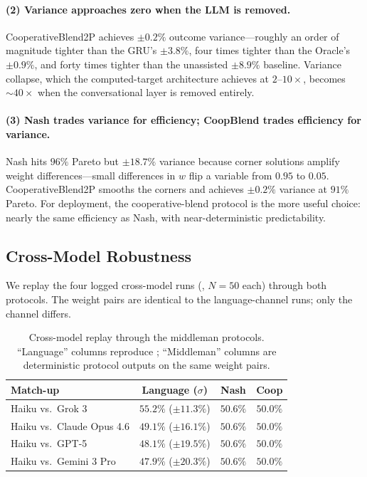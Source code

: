 \documentclass[11pt,a4paper]{article}
\begin{document}
\paragraph{(2) Variance approaches zero when the LLM is removed.} CooperativeBlend2P achieves $\pm 0.2\%$ outcome variance---roughly an order of magnitude tighter than the GRU's $\pm 3.8\%$, four times tighter than the Oracle's $\pm 0.9\%$, and forty times tighter than the unassisted $\pm 8.9\%$ baseline. Variance collapse, which the computed-target architecture achieves at $2$--$10\times$, becomes $\sim 40\times$ when the conversational layer is removed entirely.

\paragraph{(3) Nash trades variance for efficiency; CoopBlend trades efficiency for variance.} Nash hits $96\%$ Pareto but $\pm 18.7\%$ variance because corner solutions amplify weight differences---small differences in $w$ flip a variable from $0.95$ to $0.05$. CooperativeBlend2P smooths the corners and achieves $\pm 0.2\%$ variance at $91\%$ Pareto. For deployment, the cooperative-blend protocol is the more useful choice: nearly the same efficiency as Nash, with near-deterministic predictability.

\subsection{Cross-Model Robustness}
\label{sec:middleman_crossmodel}

We replay the four logged cross-model runs (, $N\!=\!50$ each) through both protocols. The weight pairs are identical to the language-channel runs; only the channel differs.

\begin{table}[h]
\centering
\caption{Cross-model replay through the middleman protocols. ``Language'' columns reproduce ; ``Middleman'' columns are deterministic protocol outputs on the same weight pairs.}
\label{tab:middleman_crossmodel}
\small
\begin{tabular}{lccc}
\toprule
Match-up & Language ($\sigma$) & Nash & Coop \\
\midrule
Haiku vs.\ Grok 3        & $55.2\%$ ($\pm 11.3\%$) & $50.6\%$ & $50.0\%$ \\
Haiku vs.\ Claude Opus 4.6 & $49.1\%$ ($\pm 16.1\%$) & $50.6\%$ & $50.0\%$ \\
Haiku vs.\ GPT-5         & $48.1\%$ ($\pm 19.5\%$) & $50.6\%$ & $50.0\%$ \\
Haiku vs.\ Gemini 3 Pro  & $47.9\%$ ($\pm 20.3\%$) & $50.6\%$ & $50.0\%$ \\
\bottomrule
\end{tabular}
\end{table}
\end{document}
